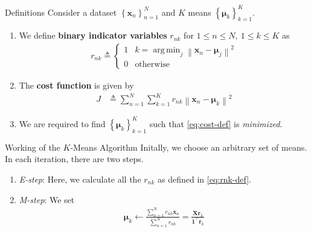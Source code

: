 \documentclass{beamer}
\DeclareMathOperator*{\argmin}{arg\,min}
\providecommand{\cbrak}[1]{\ensuremath{\left\{#1\right\}}}
\theoremstyle{remark}
\providecommand{\norm}[1]{\left\lVert#1\right\rVert}
\renewcommand{\vec}[1]{\mathbf{\boldsymbol{#1}}}
\newcounter{saveenumi}
\newcommand{\seti}{\setcounter{saveenumi}{\value{enumi}}}
\begin{document}
\begin{frame}{Definitions}
    Consider a dataset $\cbrak{\vec{x}_n}_{n=1}^N$ and $K$ means
    $\cbrak{\vec{\mu}_k}_{k=1}^K$.
    \pause
    \begin{enumerate}
        \item We define \textbf{binary indicator variables} $r_{nk}$ for 
        $1 \le n \le N,\ 1 \le k \le K$ as
            \begin{align}
                r_{nk} \triangleq
                \begin{cases}
                    1 & k = \argmin_j\norm{\vec{x}_n-\vec{\mu}_j}^2 \\
                    0 & \textrm{otherwise}
                \end{cases}
                \label{eq:rnk-def}
            \end{align}
        \pause
        \item The \textbf{cost function} is given by
            \begin{align}
                J &\triangleq \sum_{n=1}^N\sum_{k=1}^Kr_{nk}\norm{\vec{x}_n-\vec{\mu}_{k}}^2
                \label{eq:cost-def}
            \end{align}
        \pause
        \item We are required to find $\cbrak{\vec{\mu}_k}_{k=1}^K$ such that
        \eqref{eq:cost-def} is \textit{minimized}.
    \end{enumerate}
\end{frame}

\begin{frame}{Working of the $K$-Means Algorithm}
    Initally, we choose an arbitrary set of means. In each iteration, there are 
    two steps.
    \pause
    \begin{enumerate}
        \item \textit{E-step}: Here, we calculate all the $r_{nk}$ as defined
            in \eqref{eq:rnk-def}.
        \pause
        \item \textit{M-step}: We set
            \begin{align}
                \vec{\mu}_k \leftarrow \frac{\sum_{n=1}^Nr_{nk}\vec{x}_n}{\sum_{n=1}^Nr_{nk}} = \frac{\vec{Xr}_k}{\vec{1}^\top\vec{r}_k}
                \label{eq:M-step}
            \end{align}
        \seti
    \end{enumerate}
\end{frame}
\end{document}
